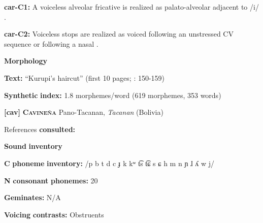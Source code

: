 \documentclass[output=paper]{langsci/langscibook}
\begin{document}
\begin{styleBody}
\textbf{car-C1:} A voiceless alveolar fricative is realized as palato-alveolar adjacent to /i/ \citep[32]{Courtz2008}.
\end{styleBody}

\begin{styleBody}
\textbf{car-C2:} Voiceless stops are realized as voiced following an unstressed CV sequence or following a nasal \citep[31]{Courtz2008}.
\end{styleBody}

\begin{styleBody}
\textbf{Morphology}
\end{styleBody}

\begin{styleBody}
\textbf{Text:} “Kurupi’s haircut” (first 10 pages; \citealt{Courtz2008}: 150-159)
\end{styleBody}

\begin{styleBody}
\textbf{Synthetic} \textbf{index:} 1.8 morphemes/word (619 morphemes, 353 words)
\end{styleBody}

\begin{styleBody}
\textbf{[cav]}   \textbf{\textsc{Cavineña}  }  Pano-Tacanan, \textit{Tacanan} (Bolivia)
\end{styleBody}

\begin{styleBody}
References \textbf{consulted:} \citet{Guillaume2008}
\end{styleBody}

\begin{styleBody}
\textbf{Sound} \textbf{inventory}
\end{styleBody}

\begin{styleBody}
\textbf{C} \textbf{phoneme} \textbf{inventory:} /p b t d c ɟ k kʷ t͡s t͡ɕ s ɕ h m n ɲ ɺ ʎ w j/
\end{styleBody}

\begin{styleBody}
\textbf{N} \textbf{consonant} \textbf{phonemes:} 20
\end{styleBody}

\begin{styleBody}
\textbf{Geminates:} N/A
\end{styleBody}

\begin{styleBody}
\textbf{Voicing} \textbf{contrasts:} Obstruents
\end{styleBody}
\end{document}
